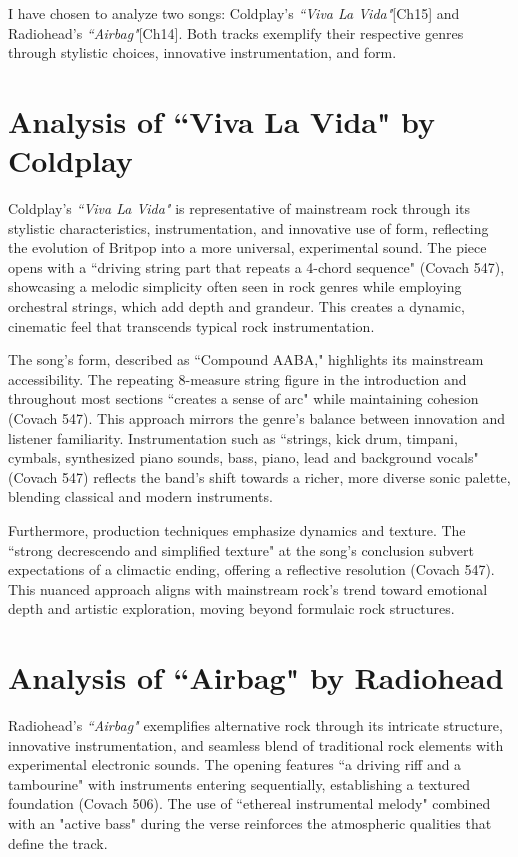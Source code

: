 \documentclass[12pt]{article}
\begin{document}
I have chosen to analyze two songs: Coldplay's \textit{``Viva La Vida"}[Ch15] and Radiohead's \textit{``Airbag"}[Ch14]. Both tracks exemplify their respective genres through stylistic choices, innovative instrumentation, and form.

\section*{Analysis of ``Viva La Vida" by Coldplay}
Coldplay's \textit{``Viva La Vida"} is representative of mainstream rock through its stylistic characteristics, instrumentation, and innovative use of form, reflecting the evolution of Britpop into a more universal, experimental sound. The piece opens with a ``driving string part that repeats a 4-chord sequence" (Covach 547), showcasing a melodic simplicity often seen in rock genres while employing orchestral strings, which add depth and grandeur. This creates a dynamic, cinematic feel that transcends typical rock instrumentation.

The song’s form, described as ``Compound AABA," highlights its mainstream accessibility. The repeating 8-measure string figure in the introduction and throughout most sections ``creates a sense of arc" while maintaining cohesion (Covach 547). This approach mirrors the genre's balance between innovation and listener familiarity. Instrumentation such as ``strings, kick drum, timpani, cymbals, synthesized piano sounds, bass, piano, lead and background vocals" (Covach 547) reflects the band’s shift towards a richer, more diverse sonic palette, blending classical and modern instruments.

Furthermore, production techniques emphasize dynamics and texture. The ``strong decrescendo and simplified texture" at the song's conclusion subvert expectations of a climactic ending, offering a reflective resolution (Covach 547). This nuanced approach aligns with mainstream rock's trend toward emotional depth and artistic exploration, moving beyond formulaic rock structures.

\section*{Analysis of ``Airbag" by Radiohead}
Radiohead's \textit{``Airbag"} exemplifies alternative rock through its intricate structure, innovative instrumentation, and seamless blend of traditional rock elements with experimental electronic sounds. The opening features ``a driving riff and a tambourine" with instruments entering sequentially, establishing a textured foundation (Covach 506). The use of ``ethereal instrumental melody" combined with an "active bass" during the verse reinforces the atmospheric qualities that define the track.
\end{document}
